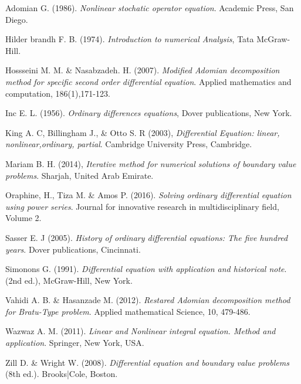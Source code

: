 \documentclass[11pt]{report}
\begin{document}
	\begin{description}
		\item Adomian G. (1986). \emph{Nonlinear stochatic operator equation}. Academic Press, San Diego.
		
		\item Hilder brandh F. B. (1974). \emph{Introduction to numerical Analysis}, Tata McGraw-Hill.
		
		\item Hossseini M. M. \& Nasabzadeh. H. (2007). \emph{Modified Adomian decomposition method for specific second order differential equation}. Applied mathematics and computation, 186(1),171-123.
		
		\item Inc E. L. (1956). \emph{Ordinary differences equations}, Dover publications, New York.
		
		\item King A. C, Billingham J., \& Otto S. R (2003), \emph{Differential Equation: linear, nonlinear,ordinary, partial}. Cambridge University Press, Cambridge.
		
		\item Mariam B. H. (2014), \emph{Iterative method for numerical solutions of boundary value problems}. Sharjah, United Arab Emirate.
		
		\item Oraphine, H., Tiza M. \& Amos P. (2016). \emph{Solving ordinary differential equation using power series}. Journal for innovative research in multidisciplinary field, Volume 2.
		
		\item Sasser E. J (2005). \emph{History of ordinary differential equations: The five hundred years}. Dover publications, Cincinnati.
		
		\item Simonons G. (1991). \emph{Differential equation with application and historical note}. (2nd ed.), McGraw-Hill, New York. 
		
		\item Vahidi A. B. \& Hasanzade M. (2012). \emph{Restared Adomian decomposition method for Bratu-Type problem}. Applied mathematical Science, 10, 479-486.
		
		\item Wazwaz A. M. (2011). \emph{Linear and Nonlinear integral equation. Method and application}. Springer, New York, USA.
		
		\item Zill D. \& Wright W. (2008). \emph{Differential equation and boundary value problems} (8th ed.). Brooks|Cole, Boston.
	\end{description}
	
\end{document}
